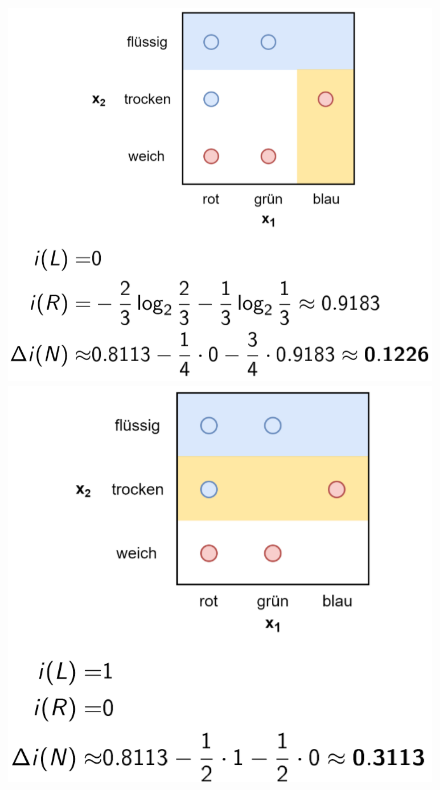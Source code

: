 \documentclass{report}
\begin{document}
  \begin{figure}[H]	
    \centering	
    \begin{minipage}[b]{0.4\textwidth}	
      \includegraphics[scale=.235]{ml07_17}	
    \end{minipage}	
    \begin{minipage}[b]{0.4\textwidth}	
      \includegraphics[scale=.235]{ml07_18}	
    \end{minipage}	
  \end{figure}	
  
\end{document}
